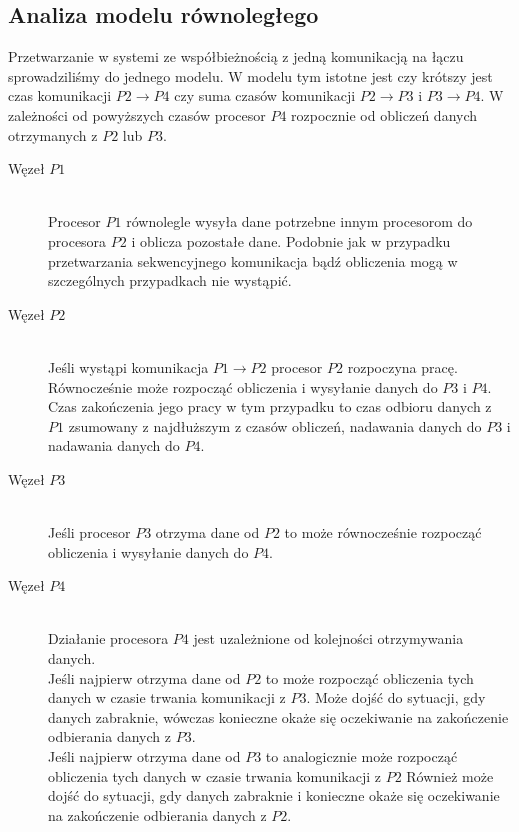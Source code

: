 \subsection{Analiza modelu równoległego}

Przetwarzanie w systemi ze współbieżnością z jedną komunikacją na łączu sprowadziliśmy do jednego modelu.
W modelu tym istotne jest czy krótszy jest czas komunikacji $P2 \to P4$ czy suma czasów komunikacji $P2 \to P3$ i $P3 \to P4$.
W zależności od powyższych czasów procesor $P4$ rozpocznie od obliczeń danych otrzymanych z $P2$ lub $P3$.

\begin{description}

\item[Węzeł $P1$] \hfill \\

Procesor $P1$ równolegle wysyła dane potrzebne innym procesorom do procesora $P2$ i oblicza pozostałe dane.
Podobnie jak w przypadku przetwarzania sekwencyjnego komunikacja bądź obliczenia mogą w szczególnych przypadkach nie wystąpić.

\item[Węzeł $P2$] \hfill \\

Jeśli wystąpi komunikacja $P1 \to P2$ procesor $P2$ rozpoczyna pracę. Równocześnie może rozpocząć obliczenia i wysyłanie danych do $P3$ i $P4$.
Czas zakończenia jego pracy w tym przypadku to czas odbioru danych z $P1$ zsumowany z najdłuższym z czasów obliczeń, nadawania danych do $P3$ i nadawania danych do $P4$.

\item[Węzeł $P3$] \hfill \\

Jeśli procesor $P3$ otrzyma dane od $P2$ to może równocześnie rozpocząć obliczenia i wysyłanie danych do $P4$.

\item[Węzeł $P4$] \hfill \\

Działanie procesora $P4$ jest uzależnione od kolejności otrzymywania danych. \\

Jeśli najpierw otrzyma dane od $P2$ to może rozpocząć obliczenia tych danych w czasie trwania komunikacji z $P3$.
Może dojść do sytuacji, gdy danych zabraknie, wówczas konieczne okaże się oczekiwanie na zakończenie odbierania danych z $P3$. \\

Jeśli najpierw otrzyma dane od $P3$ to analogicznie może rozpocząć obliczenia tych danych w czasie trwania komunikacji z $P2$
Również może dojść do sytuacji, gdy danych zabraknie i konieczne okaże się oczekiwanie na zakończenie odbierania danych z $P2$.

\end{description}

